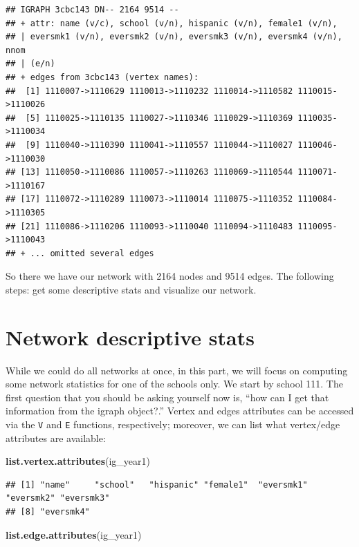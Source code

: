 \documentclass[]{book}
\newenvironment{Shaded}{\begin{snugshade}}{\end{snugshade}}
\newcommand{\KeywordTok}[1]{\textcolor[rgb]{0.13,0.29,0.53}{\textbf{#1}}}
\newcommand{\NormalTok}[1]{#1}
\begin{document}
\begin{verbatim}
## IGRAPH 3cbc143 DN-- 2164 9514 -- 
## + attr: name (v/c), school (v/n), hispanic (v/n), female1 (v/n),
## | eversmk1 (v/n), eversmk2 (v/n), eversmk3 (v/n), eversmk4 (v/n), nnom
## | (e/n)
## + edges from 3cbc143 (vertex names):
##  [1] 1110007->1110629 1110013->1110232 1110014->1110582 1110015->1110026
##  [5] 1110025->1110135 1110027->1110346 1110029->1110369 1110035->1110034
##  [9] 1110040->1110390 1110041->1110557 1110044->1110027 1110046->1110030
## [13] 1110050->1110086 1110057->1110263 1110069->1110544 1110071->1110167
## [17] 1110072->1110289 1110073->1110014 1110075->1110352 1110084->1110305
## [21] 1110086->1110206 1110093->1110040 1110094->1110483 1110095->1110043
## + ... omitted several edges
\end{verbatim}

So there we have our network with 2164 nodes and 9514 edges. The following steps: get some descriptive stats and visualize our network.

\hypertarget{network-descriptive-stats}{%
\section{Network descriptive stats}\label{network-descriptive-stats}}

While we could do all networks at once, in this part, we will focus on computing some network statistics for one of the schools only. We start by school 111. The first question that you should be asking yourself now is, ``how can I get that information from the igraph object?.'' Vertex and edges attributes can be accessed via the \texttt{V} and \texttt{E} functions, respectively; moreover, we can list what vertex/edge attributes are available:

\begin{Shaded}
\begin{Highlighting}[]
\KeywordTok{list.vertex.attributes}\NormalTok{(ig_year1)}
\end{Highlighting}
\end{Shaded}

\begin{verbatim}
## [1] "name"     "school"   "hispanic" "female1"  "eversmk1" "eversmk2" "eversmk3"
## [8] "eversmk4"
\end{verbatim}

\begin{Shaded}
\begin{Highlighting}[]
\KeywordTok{list.edge.attributes}\NormalTok{(ig_year1) }
\end{Highlighting}
\end{Shaded}
\end{document}
